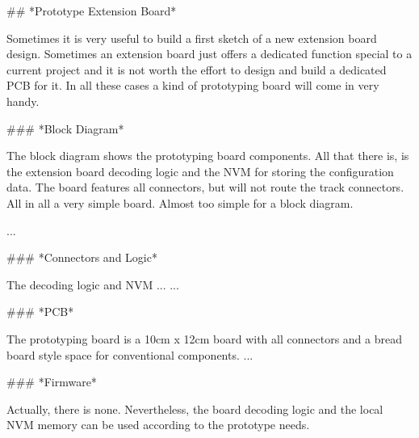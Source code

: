 ## *Prototype Extension Board*

Sometimes it is very useful to build a first sketch of a new extension board design. Sometimes an extension board just offers a dedicated function special to a current project and it is not worth the effort to design and build a dedicated PCB for it. In all these cases a kind of prototyping board will come in very handy.

### *Block Diagram*

The block diagram shows the prototyping board components. All that there is, is the extension board decoding logic and the NVM for storing the configuration data. The board features all connectors, but will not route the track connectors. All in all a very simple board. Almost too simple for a block diagram.

...

### *Connectors and Logic*

The decoding logic and NVM ...
...

### *PCB*

The prototyping board is a 10cm x 12cm board with all connectors and a bread board style space for conventional components.
...

### *Firmware*

Actually, there is none. Nevertheless, the board decoding logic and the local NVM memory can be used according to the prototype needs.


